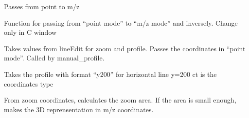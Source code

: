 \documentclass[letterpaper,10pt,openany,oneside]{sphinxmanual}
\begin{document}
\begin{fulllineitems}
\begin{fulllineitems}
\end{fulllineitems}


\begin{fulllineitems}
\label{rst/visu2d:Visu.interface_actions.INTERACT.swap_from_proint}
Passes from point to m/z

\end{fulllineitems}


\begin{fulllineitems}
\label{rst/visu2d:Visu.interface_actions.INTERACT.swap_pt_mz}
Function for passing from ``point mode'' to ``m/z mode'' and inversely.
Change only in C window

\end{fulllineitems}


\begin{fulllineitems}
\label{rst/visu2d:Visu.interface_actions.INTERACT.take_lineEdit}
Takes values from lineEdit for zoom and profile. 
Passes the coordinates in ``point mode''.
Called by manual\_profile.

\end{fulllineitems}


\begin{fulllineitems}
\label{rst/visu2d:Visu.interface_actions.INTERACT.take_lineEdit_xy_format}
Takes the profile with format ``y200'' for horizontal line y=200
ct is the coordinates type

\end{fulllineitems}


\begin{fulllineitems}
\label{rst/visu2d:Visu.interface_actions.INTERACT.zoom3D}
From zoom coordinates, calculates the zoom area. 
If the area is small enough, makes the 3D reprensentation in m/z coordinates.

\end{fulllineitems}


\end{fulllineitems}
\end{document}

